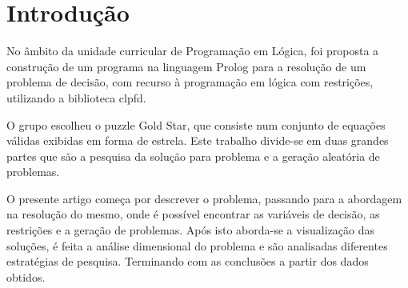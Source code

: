 \section{Introdução}

No âmbito da unidade curricular de Programação em Lógica, foi proposta a construção de um programa na linguagem Prolog para a resolução de um problema de decisão, com recurso à programação em lógica com restrições, utilizando a biblioteca clpfd. 

O grupo escolheu o puzzle Gold Star, que consiste num conjunto de equações válidas exibidas em forma de estrela. 
Este trabalho divide-se em duas grandes partes que são a pesquisa da solução para problema e a geração aleatória de problemas.

O presente artigo começa por descrever o problema, passando para a abordagem na resolução do mesmo, onde é possível encontrar as variáveis de decisão, as restrições e a geração de problemas. Após isto aborda-se a visualização das soluções, é feita a análise dimensional do problema e são analisadas diferentes estratégias de pesquisa. Terminando com as conclusões a partir dos dados obtidos.